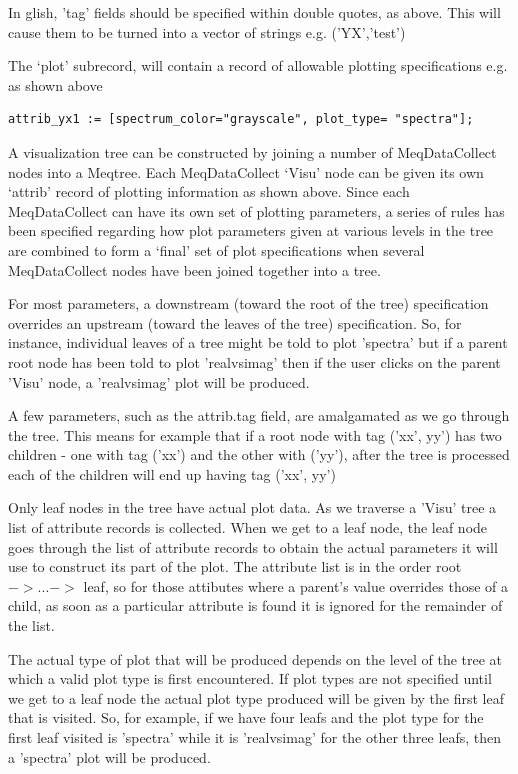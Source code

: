 \documentclass[10pt]{article}
\begin{document}
In glish, 'tag' fields should be specified within double quotes, as above.
This will cause them to be turned into a vector of strings e.g. ('YX','test')

The `plot' subrecord, will contain a record of allowable plotting
specifications e.g. as shown above

\begin{verbatim}
attrib_yx1 := [spectrum_color="grayscale", plot_type= "spectra"];
\end{verbatim}

A visualization tree can be constructed by joining a number of
MeqDataCollect nodes into a Meqtree. Each MeqDataCollect `Visu' node
can be given its own `attrib' record of plotting information
as shown above. Since each MeqDataCollect can have its own set of
plotting parameters, a series of rules has been specified regarding
how plot parameters given at various levels in the tree are combined
to form a `final' set of plot specifications when several MeqDataCollect
nodes have been joined together into a tree.

For most parameters, a downstream (toward the root of the tree)
specification overrides an upstream (toward the leaves of the tree)
specification.  So, for instance, individual
leaves of a tree might be told to plot 'spectra' but if a parent
root node has been told to plot 'realvsimag' then if the user
clicks on the parent 'Visu' node, a 'realvsimag' plot will be produced.

A few parameters, such as the attrib.tag field, are amalgamated
as we go through the tree. This means for example that if
a root node with tag ('xx', yy') has two children - one with tag
('xx') and the other with ('yy'), after the tree is processed
each of the children will end up having tag ('xx', yy') 

Only leaf nodes in the tree have actual plot data. As we traverse a
'Visu' tree a list of attribute records is collected. When we
get to a leaf node, the leaf node goes through the list of attribute
records to obtain the actual parameters it will use to construct
its part of the plot. The attribute list is in the order
root $-> ... ->$ leaf, so for those attibutes where a parent's value
overrides those of a child, as soon as a particular attribute is found
it is ignored for the remainder of the list.

The actual type of plot that will be produced depends on
the level of the tree at which a valid plot type is first encountered.
If plot types are not specified until we get to a leaf node
the actual plot type produced will be given by the first leaf that
is visited. So, for example, if we have four leafs and the
plot type for the first leaf visited is 'spectra' while it
is 'realvsimag' for the other three leafs, then a 'spectra' plot
will be produced.
\end{document}
